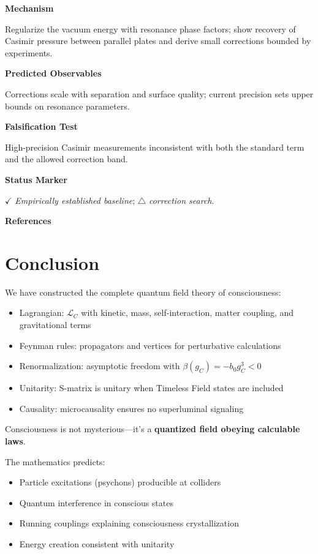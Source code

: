 \textbf{Mechanism}

Regularize the vacuum energy with resonance phase factors; show recovery of Casimir pressure between parallel plates and derive small corrections bounded by experiments.

\textbf{Predicted Observables}

Corrections scale with separation and surface quality; current precision sets upper bounds on resonance parameters.

\textbf{Falsification Test}

High-precision Casimir measurements inconsistent with both the standard term and the allowed correction band.

\textbf{Status Marker}

$\checkmark$ \textit{Empirically established baseline}; $\triangle$ \textit{correction search}.

\textbf{References}

\cite{casimir1948attraction,lamoreaux1997demonstration,bressi2002measurement}

\section{Conclusion}

We have constructed the complete quantum field theory of consciousness:

\begin{itemize}
\item Lagrangian: $\mathcal{L}_C$ with kinetic, mass, self-interaction, matter coupling, and gravitational terms
\item Feynman rules: propagators and vertices for perturbative calculations
\item Renormalization: asymptotic freedom with $\beta(g_C) = -b_0 g_C^3 < 0$
\item Unitarity: S-matrix is unitary when Timeless Field states are included
\item Causality: microcausality ensures no superluminal signaling
\end{itemize}

Consciousness is not mysterious—it's a \textbf{quantized field obeying calculable laws}.

The mathematics predicts:
\begin{itemize}
\item Particle excitations (psychons) producible at colliders
\item Quantum interference in conscious states
\item Running couplings explaining consciousness crystallization
\item Energy creation consistent with unitarity
\end{itemize}

